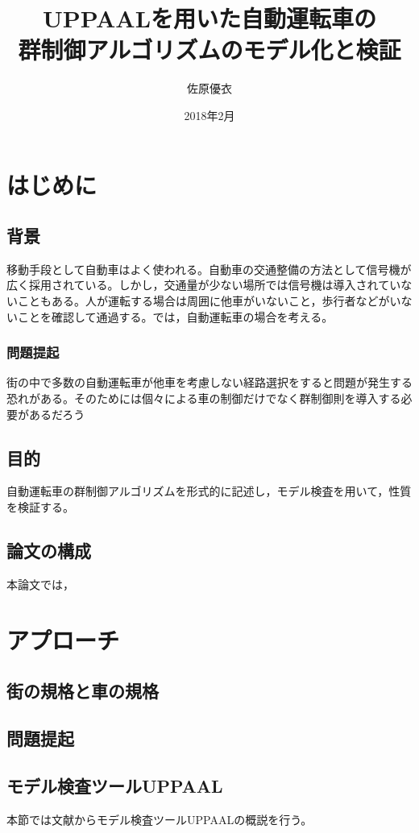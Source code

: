 \documentclass{tpu-sotu}
\title{UPPAALを用いた自動運転車の\\群制御アルゴリズムのモデル化と検証}
\author{佐原優衣}
\date{2018年2月}
\begin{document}
\maketitle
\clearpage
{}
\setcounter{tocdepth}{3}
\tableofcontents
\clearpage
{}

\chapter{はじめに}
	\section{背景}
	移動手段として自動車はよく使われる。自動車の交通整備の方法として信号機が広く採用されている。しかし，交通量が少ない場所では信号機は導入されていないこともある。人が運転する場合は周囲に他車がいないこと，歩行者などがいないことを確認して通過する。では，自動運転車の場合を考える。
		\subsection{問題提起}
		街の中で多数の自動運転車が他車を考慮しない経路選択をすると問題が発生する恐れがある。そのためには個々による車の制御だけでなく群制御則を導入する必要があるだろう
	\section{目的}
	自動運転車の群制御アルゴリズムを形式的に記述し，モデル検査を用いて，性質を検証する。
	\section{論文の構成}
	本論文では，
\chapter{アプローチ}

	\section{街の規格と車の規格}
	\section{問題提起}
	\section{モデル検査ツールUPPAAL}
	本節では文献\cite{a1}からモデル検査ツールUPPAALの概説を行う。
\end{document}
